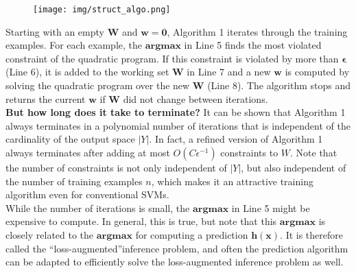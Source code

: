 \documentclass[twoside]{article}
\begin{document}
\begin{figure}[h]
\centering
\texttt{[image: img/struct\_algo.png]}
\end{figure}


Starting
with an empty $\mathbf{W}$ and $\mathbf{w=0}$, Algorithm 1 iterates through
the training examples. For each example, the $\mathbf{argmax}$ in Line 5 finds the most violated constraint of the quadratic
program. If this constraint is violated by more than $\mathbf{\epsilon}$ (Line 6), it is added to the working set $\mathbf{W}$ in Line 7 and a
new $\mathbf{w}$ is computed by solving the quadratic program over
the new $\mathbf{W}$ (Line 8). The algorithm stops and returns the
current $\mathbf{w}$ if $\mathbf{W}$ did not change between iterations.\\ 

\textbf{But how long does
it take to terminate?} It can be shown that Algorithm 1
always terminates in a polynomial number of iterations that is independent of the cardinality of the output space $|Y|$. In
fact, a refined version of Algorithm 1  always terminates after adding at most $O(C\epsilon^{-1})$ constraints to $W$. Note that the number of constraints
is not only independent of $|Y|$, but also independent of the
number of training examples $n$, which makes it an attractive
training algorithm even for conventional SVMs. \\
While the number of iterations is small, the $\mathbf{argmax}$ in
Line 5 might be expensive to compute. In general, this is
true, but note that this $\mathbf{argmax}$ is closely related to the
$\mathbf{argmax}$ for computing a prediction $\mathbf{h(x)}$. It is therefore
called the “loss-augmented”inference problem, and often the
prediction algorithm can be adapted to efficiently solve the
loss-augmented inference problem as well.
\end{document}
